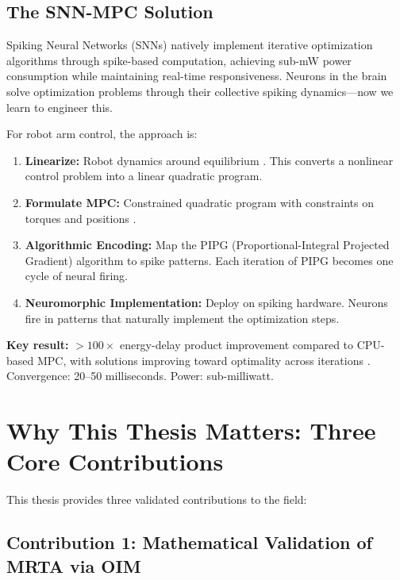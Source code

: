 \subsection{The SNN-MPC Solution}

Spiking Neural Networks (SNNs) \cite{Maass1997, Gerstner2014} natively implement iterative optimization algorithms through spike-based computation, achieving sub-mW power consumption while maintaining real-time responsiveness. Neurons in the brain solve optimization problems through their collective spiking dynamics---now we learn to engineer this.

For robot arm control, the approach is:
\begin{enumerate}
\item \textbf{Linearize:} Robot dynamics around equilibrium \cite{Siciliano2016}. This converts a nonlinear control problem into a linear quadratic program.

\item \textbf{Formulate MPC:} Constrained quadratic program with constraints on torques and positions \cite{Rawlings2020}.

\item \textbf{Algorithmic Encoding:} Map the PIPG (Proportional-Integral Projected Gradient) \cite{He2016} algorithm to spike patterns. Each iteration of PIPG becomes one cycle of neural firing.

\item \textbf{Neuromorphic Implementation:} Deploy on spiking hardware. Neurons fire in patterns that naturally implement the optimization steps.
\end{enumerate}

\textbf{Key result:} $>100\times$ energy-delay product improvement compared to CPU-based MPC, with solutions improving toward optimality across iterations \cite{Davies2018}. Convergence: 20--50 milliseconds. Power: sub-milliwatt.

\section{Why This Thesis Matters: Three Core Contributions}

This thesis provides three validated contributions to the field:

\subsection{Contribution 1: Mathematical Validation of MRTA via OIM}

